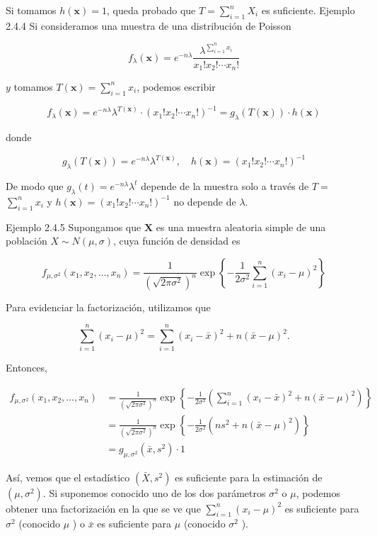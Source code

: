 \documentclass[
]{article}
\begin{document}
Si tomamos \(h(\mathbf{x})=1\), queda probado que \(T=\sum_{i=1}^{n} X_{i}\) es suficiente.
Ejemplo 2.4.4 Si consideramos una muestra de una distribución de Poisson

\[
f_{\lambda}(\mathbf{x})=e^{-n \lambda} \frac{\lambda^{\sum_{i=1}^{n} x_{i}}}{x_{1}!x_{2}!\cdots x_{n}!}
\]

\(y\) tomamos \(T(\mathbf{x})=\sum_{i=1}^{n} x_{i}\), podemos escribir

\[
f_{\lambda}(\mathbf{x})=e^{-n \lambda} \lambda^{T(\mathbf{x})} \cdot\left(x_{1}!x_{2}!\cdots x_{n}!\right)^{-1}=g_{\lambda}(T(\mathbf{x})) \cdot h(\mathbf{x})
\]

donde

\[
g_{\lambda}(T(\mathbf{x}))=e^{-n \lambda} \lambda^{T(\mathbf{x})}, \quad h(\mathbf{x})=\left(x_{1}!x_{2}!\cdots x_{n}!\right)^{-1}
\]

De modo que \(g_{\lambda}(t)=e^{-n \lambda} \lambda^{t}\) depende de la muestra solo a través de \(T=\) \(\sum_{i=1}^{n} x_{i}\) y \(h(\mathbf{x})=\left(x_{1}!x_{2}!\cdots x_{n}!\right)^{-1}\) no depende de \(\lambda\).

Ejemplo 2.4.5 Supongamos que \(\mathbf{X}\) es una muestra aleatoria simple de una población \(X \sim N(\mu, \sigma)\), cuya función de densidad es

\[
f_{\mu, \sigma^{2}}\left(x_{1}, x_{2}, \ldots, x_{n}\right)=\frac{1}{\left(\sqrt{2 \pi \sigma^{2}}\right)^{n}} \exp \left\{-\frac{1}{2 \sigma^{2}} \sum_{i=1}^{n}\left(x_{i}-\mu\right)^{2}\right\}
\]

Para evidenciar la factorización, utilizamos que

\[
\sum_{i=1}^{n}\left(x_{i}-\mu\right)^{2}=\sum_{i=1}^{n}\left(x_{i}-\bar{x}\right)^{2}+n(\bar{x}-\mu)^{2} .
\]

Entonces,

\[
\begin{aligned}
f_{\mu, \sigma^{2}}\left(x_{1}, x_{2}, \ldots, x_{n}\right) & =\frac{1}{\left(\sqrt{2 \pi \sigma^{2}}\right)^{n}} \exp \left\{-\frac{1}{2 \sigma^{2}}\left(\sum_{i=1}^{n}\left(x_{i}-\bar{x}\right)^{2}+n(\bar{x}-\mu)^{2}\right)\right\} \\
& =\frac{1}{\left(\sqrt{2 \pi \sigma^{2}}\right)^{n}} \exp \left\{-\frac{1}{2 \sigma^{2}}\left(n s^{2}+n(\bar{x}-\mu)^{2}\right)\right\} \\
& =g_{\mu, \sigma^{2}}\left(\bar{x}, s^{2}\right) \cdot 1
\end{aligned}
\]

Así, vemos que el estadístico \(\left(\bar{X}, s^{2}\right)\) es suficiente para la estimación de \(\left(\mu, \sigma^{2}\right)\).
Si suponemos conocido uno de los dos parámetros \(\sigma^{2}\) o \(\mu\), podemos obtener una factorización en la que se ve que \(\sum_{i=1}^{n}\left(x_{i}-\mu\right)^{2}\) es suficiente para \(\sigma^{2}\) (conocido \(\mu\) ) o \(\bar{x}\) es suficiente para \(\mu\) (conocido \(\sigma^{2}\) ).
\end{document}
